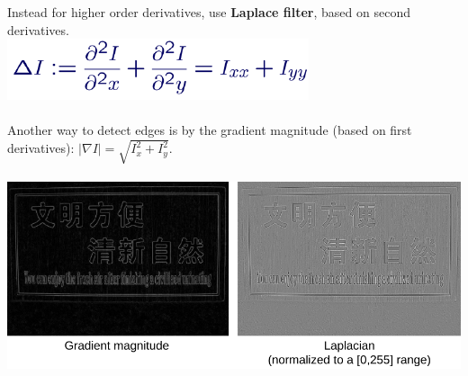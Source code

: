 \documentclass{article}
\begin{document}
Instead for higher order derivatives, use \textbf{Laplace filter}, based on second derivatives.\\
\includegraphics[scale=0.35]{28.png}\\\\
Another way to detect edges is by the gradient magnitude (based on first derivatives): $|\nabla I|=\sqrt{I^2_x+I^2_y}$.\\\\
\includegraphics[scale=0.3]{29.png}\\\\
\end{document}
